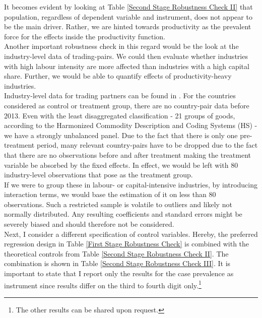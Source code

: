 \documentclass{article}
\begin{document}
It becomes evident by looking at Table \ref{Second Stage Robustness Check II} that population, regardless of dependent variable and instrument, does not appear to be the main driver. Rather, we are hinted towards productivity as the prevalent force for the effects inside the productivity function.\\
Another important robustness check in this regard would be the look at the industry-level data of trading-pairs. We could then evaluate whether industries with high labour intensity are more affected than industries with a high capital share. Further, we would be able to quantify effects of productivity-heavy industries. \\
Industry-level data for trading partners can be found in \cite{comtrade2015comtrade}. For the countries considered as control or treatment group, there are no country-pair data before 2013. Even with the least disaggregated classification - 21 groups of goods, according to the Harmonized Commodity Description and Coding Systems (HS) - we have a strongly unbalanced panel. Due to the fact that there is only one pre-treatment period, many relevant country-pairs have to be dropped due to the fact that there are no observations before and after treatment making the treatment variable be absorbed by the fixed effects. In effect, we would be left with 80 industry-level observations that pose as the treatment group. \\
If we were to group these in labour- or capital-intensive industries, by introducing interaction terms, we would base the estimation of it on less than 80 observations. Such a restricted sample is volatile to outliers and likely not normally distributed. Any resulting coefficients and standard errors might be severely biased and should therefore not be considered. \\
Next, I consider a different specification of control variables. Hereby, the preferred regression design in Table \ref{First Stage Robustness Check} is combined with the theoretical controls from Table \ref{Second Stage Robustness Check II}. The combination is shown in Table \ref{Second Stage Robustness Check III}. It is important to state that I report only the results for the case prevalence as instrument since results differ on the third to fourth digit only.\footnote{The other results can be shared upon request.}
\end{document}

